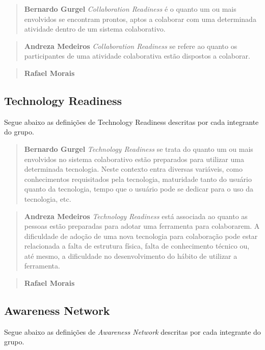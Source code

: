 \documentclass{acm_proc_article-sp}
\begin{document}
\begin{quote}\textbf{Bernardo Gurgel}
\textsl{Collaboration Readiness} é o quanto um ou mais envolvidos se encontram prontos, aptos a colaborar com uma determinada atividade dentro de um sistema colaborativo.
\end{quote}

\begin{quote}\textbf{Andreza Medeiros}
  \textsl{Collaboration Readiness} se refere ao quanto os participantes de uma atividade colaborativa estão dispostos a colaborar.
\end{quote}

\begin{quote}\textbf{Rafael Morais}
\end{quote}

\subsection{Technology Readiness}
Segue abaixo as definições de Technology Readiness descritas por cada integrante do grupo.

\begin{quote}\textbf{Bernardo Gurgel}
\textsl{Technology Readiness} se trata do quanto um ou mais envolvidos no sistema colaborativo estão preparados para utilizar uma determinada tecnologia. Neste contexto entra diversas variáveis, como conhecimentos requisitados pela tecnologia, maturidade tanto do usuário quanto da tecnologia, tempo que o usuário pode se dedicar para o uso da tecnologia, etc.
\end{quote}

\begin{quote}\textbf{Andreza Medeiros}
\textsl{Technology Readiness} está associada ao quanto as pessoas estão preparadas para adotar uma ferramenta para colaborarem. A dificuldade de adoção de uma nova tecnologia para colaboração pode estar relacionada a falta de estrutura física, falta de conhecimento técnico ou, até mesmo, a dificuldade no desenvolvimento do hábito de utilizar a ferramenta.
\end{quote}

\begin{quote}\textbf{Rafael Morais}
\end{quote}

\subsection{Awareness Network}
Segue abaixo as definições de \textsl{Awareness Network} descritas por cada integrante do grupo.
\end{document}
